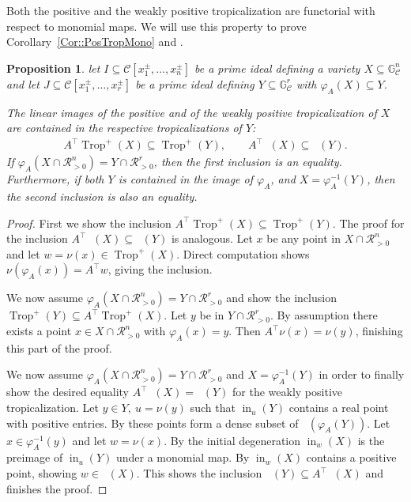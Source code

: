 \documentclass{article}
\newtheorem{proposition}[theorem]{Proposition}
\theoremstyle{definition}
\DeclareMathOperator{\initial}{in}
\DeclareMathOperator{\Trop}{Trop}
\DeclareMathOperator{\Tropw}{Trop_\mathcal{C}^+}
\newcommand{\RR}{\mathcal{R}}
\newcommand{\CC}{\mathcal{C}}
\newcommand{\inw}{\operatorname{in}_w}
\begin{document}
Both the positive and the weakly positive tropicalization are functorial with respect to monomial maps. We will use this property to prove Corollary~\ref{Cor::PosTropMono} and .
\begin{proposition}
\label{prop: functoriality of monomial maps}
let $I \subseteq \CC[x_1^\pm, \dots, x_n^\pm]$ be a prime ideal defining a variety $X \subseteq \mathbb{G}^n_\CC$ and let
$J \subseteq \CC[x_1^\pm, \dots, x_r^\pm]$ be a prime ideal defining $Y \subseteq \mathbb{G}^r_\CC$
with $\varphi_A(X) \subseteq Y$.

    The linear images of the positive and of the weakly positive tropicalization of $X$ are contained in the respective tropicalizations of $Y$:
    \begin{align*}
            A^\top \Trop^+(X) \subseteq \Trop^+(Y), \qquad A^\top\Tropw(X) \subseteq \Tropw(Y).
    \end{align*}
    If $\varphi_A(X \cap \RR^n_{> 0 }) = Y\cap\RR^r_{> 0}$,
    then the first inclusion is an equality.
    Furthermore, if both $Y$ is contained in the image of $\varphi_A$,
    and $X = \varphi_A^{-1}(Y)$,
    then the second inclusion is also an equality.
\end{proposition}
\begin{proof}
    First we show the inclusion $A^\top \Trop^+(X) \subseteq \Trop^+(Y)$. The proof for the inclusion $A^\top \Tropw(X) \subseteq \Tropw(Y)$ is analogous.
    Let $x$ be any point in $X \cap \mathcal{R}^n_{>0}$ and let $w = \nu(x) \in \Trop^+(X)$. 
    Direct computation shows $\nu(\varphi_A(x)) = A^\top w$, giving the inclusion.

    We now assume $\varphi_A(X \cap \RR^n_{> 0 }) = Y\cap\RR^r_{> 0}$ and show the inclusion  $\Trop^+(Y) \subseteq A^\top\Trop^+(X)$.
    Let $y$ be in $Y \cap \RR^r_{> 0}$. By assumption there exists a point $x \in X \cap \RR^n_{>0}$ with $\varphi_A(x) = y$. Then $A^\top \nu(x) = \nu(y)$, finishing this part of the proof.

    We now assume $\varphi_A(X \cap \RR^n_{> 0 }) = Y\cap\RR^r_{> 0}$ 
    and $X = \varphi_A^{-1}(Y)$
    in order to finally show the desired equality $A^\top\Tropw(X) = \Tropw(Y)$ for the weakly positive tropicalization.
    Let $y \in Y, \ u  = \nu(y)$ such that
    $\initial_{u} (Y) $ contains a real point with positive entries.
    By  these points form a dense subset of $\Tropw(\varphi_A(Y))$.
     Let $x \in \varphi_A^{-1}(y)$ and let $w = \nu(x)$.
    By  the initial degeneration $\inw(X)$ is the preimage of $\initial_{u} (Y)$ under a monomial map. By  $\inw(X)$ contains a positive point, showing $w \in \Tropw(X)$.
    This shows the inclusion $\Tropw(Y) \subseteq A^\top\Tropw(X)$ and finishes the proof.
\end{proof}
\end{document}
